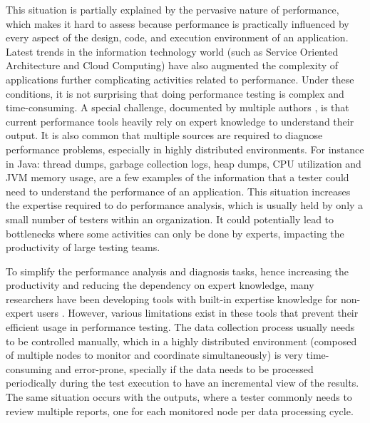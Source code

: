 \documentclass[runningheads,a4paper]{llncs}
\begin{document}
This situation is partially explained by the pervasive nature of
performance, which makes it hard to assess because performance is practically
influenced by every aspect of the design, code, and execution environment
of an application. Latest trends in the information technology world (such as
Service Oriented Architecture and Cloud Computing) have also augmented the
complexity of applications further complicating activities related to
performance. Under these conditions, it is not surprising that doing performance
testing is complex and time-consuming. A special challenge, documented by
multiple authors \cite{Woodside2007,trevor1,Angelopoulos2012}, is that current
performance tools heavily rely on expert knowledge to understand their output.
It is also common that multiple sources are required to diagnose
performance problems, especially in highly distributed environments. For
instance in Java: thread dumps, garbage collection logs, heap dumps, CPU
utilization and JVM memory usage, are a few examples of the information that a
tester could need to understand the performance of an application. This
situation increases the expertise required to do performance analysis, which is
usually held by only a small number of testers within an organization. It
could potentially lead to bottlenecks where some activities can only be done by
experts, impacting the productivity of large testing teams.

To simplify the performance analysis and diagnosis tasks, hence increasing the
productivity and reducing the dependency on expert knowledge, many researchers
have been developing tools with built-in expertise knowledge for non-expert
users \cite{Altman2010,pat7,Angelopoulos2012a}. However, various limitations
exist in these tools that prevent their efficient usage in performance testing.
The data collection process usually needs to be controlled manually, which in a
highly distributed environment (composed of multiple nodes to monitor and
coordinate simultaneously) is very time-consuming and error-prone, specially if
the data needs to be processed periodically during the test execution to have an
incremental view of the results. The same situation occurs with the outputs,
where a tester commonly needs to review multiple reports, one for each monitored
node per data processing cycle.
\end{document}
